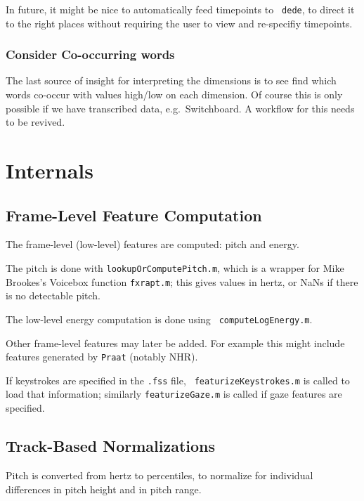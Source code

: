 \documentclass[11pt]{article}
\begin{document}
In future, it might be nice to automatically feed timepoints to {\tt
  dede}, to direct it to the right places without requiring the user
to view and re-specifiy timepoints.


\subsubsection{Consider Co-occurring words} 

The last source of insight for interpreting the dimensions is to see
find which words co-occur with values high/low on each dimension.  Of
course this is only possible if we have transcribed data,
e.g.~Switchboard.  A
workflow for this needs to be revived.


\section{Internals}

\subsection{Frame-Level Feature Computation}

The frame-level (low-level) features are computed: pitch and energy.

The pitch is done with {\tt lookupOrComputePitch.m}, which is a
wrapper for Mike Brookes's Voicebox function {\tt fxrapt.m}; this
gives values in hertz, or NaNs if there is no detectable pitch.

The low-level energy computation is done using {\tt
  computeLogEnergy.m}.

Other frame-level features may later be added.  For example this might
include features  generated by {\tt Praat} (notably NHR).  

If keystrokes are specified in the {\tt .fss} file, {\tt
  featurizeKeystrokes.m} is called to load that information; similarly
{\tt featurizeGaze.m} is called if gaze features are specified.

\subsection{Track-Based Normalizations}

Pitch is converted from hertz to percentiles, to normalize for
individual differences in pitch height and in pitch range.
\end{document}
